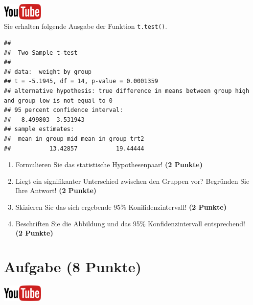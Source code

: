 \documentclass[a4paper, 10pt]{scrartcl}\usepackage[]{graphicx}\usepackage[]{xcolor}
\makeatletter
\newenvironment{kframe}{%
 \def\at@end@of@kframe{}%
 \ifinner\ifhmode%
  \def\at@end@of@kframe{\end{minipage}}%
  \begin{minipage}{\columnwidth}%
 \fi\fi%
 \def\FrameCommand##1{\hskip\@totalleftmargin \hskip-\fboxsep
 \colorbox{shadecolor}{##1}\hskip-\fboxsep
     \hskip-\linewidth \hskip-\@totalleftmargin \hskip\columnwidth}%
 \MakeFramed {\advance\hsize-\width
   \@totalleftmargin\z@ \linewidth\hsize
   \@setminipage}}%
 {\par\unskip\endMakeFramed%
 \at@end@of@kframe}
\newenvironment{knitrout}{}{} %
\makeatother
\begin{document}
\hfill\href{https://youtu.be/wJqsNV1hOW8}{\includegraphics[width =
  2cm]{img/youtube}}\\[1Ex]

Sie erhalten folgende \Rlogo Ausgabe der Funktion \texttt{t.test()}.

\begin{knitrout}
\color{fgcolor}\begin{kframe}
\begin{verbatim}
## 
## 	Two Sample t-test
## 
## data:  weight by group
## t = -5.1945, df = 14, p-value = 0.0001359
## alternative hypothesis: true difference in means between group high and group low is not equal to 0
## 95 percent confidence interval:
##  -8.499803 -3.531943
## sample estimates:
##  mean in group mid mean in group trt2 
##           13.42857           19.44444
\end{verbatim}
\end{kframe}
\end{knitrout}


\begin{enumerate}
  \item Formulieren Sie das statistische Hypothesenpaar! \textbf{(2
Punkte)}
\item Liegt ein signifikanter Unterschied zwischen den Gruppen vor?
  Begr{\"u}nden Sie Ihre Antwort! \textbf{(2 Punkte)}
\item Skizieren Sie das sich ergebende 95\% Konifidenzintervall! \textbf{(2 Punkte)}
\item Beschriften Sie die Abbildung und
  das 95\% Konfidenzintervall entsprechend! \textbf{(2 Punkte)}  
\end{enumerate} 
\clearpage

\section{Aufgabe \hfill (8 Punkte)}

\hfill\href{https://youtu.be/w62HJlbN28U}{\includegraphics[width =
  2cm]{img/youtube}}\\[1Ex]
\end{document}
